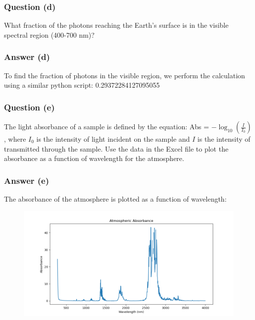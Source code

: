 \documentclass{article}
\begin{document}
\subsubsection{Question (d)}
What fraction of the photons reaching the Earth's surface is in the visible spectral region (400-700 nm)?

\subsubsection{Answer (d)}
To find the fraction of photons in the visible region, we perform the calculation using a similar python script: 0.29372284127095055

\subsubsection{Question (e)}
The light absorbance of a sample is defined by the equation: Abs = \(-\log_{10}(\frac{I}{I_0})\), where \(I_0\) is the intensity of light incident on the sample and \(I\) is the intensity of transmitted through the sample. Use the data in the Excel file to plot the absorbance as a function of wavelength for the atmosphere.

\subsubsection{Answer (e)}
The absorbance of the atmosphere is plotted as a function of wavelength:
\begin{figure}[h]
    \centering
    \includegraphics[width=\textwidth]{absorbance_corrected.png}
\end{figure}
\end{document}
